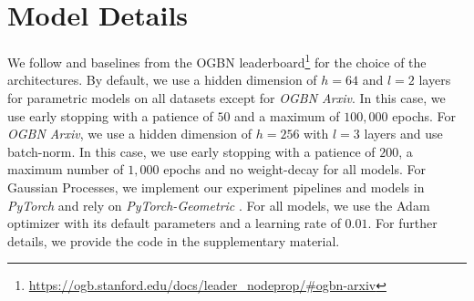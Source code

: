 

\section{Model Details} \label{sec:app_model_details}

We follow \citep{Shchur2018, Klicpera2019, Zhao2020} and baselines from the OGBN leaderboard\footnote{\url{https://ogb.stanford.edu/docs/leader_nodeprop/\#ogbn-arxiv}} for the choice of the architectures. By default, we use a hidden dimension of $h = 64$ and $l=2$ layers for parametric models on all datasets except for \emph{OGBN Arxiv}. In this case, we use early stopping with a patience of $50$ and a maximum of $100,000$ epochs. For \emph{OGBN Arxiv}, we use a hidden dimension of $h = 256$ with $l=3$ layers and use batch-norm. In this case, we use early stopping with a patience of $200$, a maximum number of $1,000$ epochs and no weight-decay for all models. For Gaussian Processes, we implement our experiment pipelines and models in \emph{PyTorch} \citep{pytorch} and rely on \emph{PyTorch-Geometric} \citep{pytorch-geometric}. For all models, we use the Adam optimizer \citep{Kingma2014} with its default parameters and a learning rate of $0.01$. For further details, we provide the code in the supplementary material.

